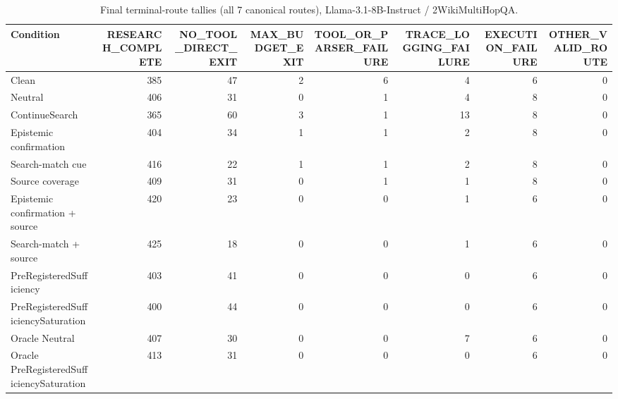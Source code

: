 \begin{table}[t]
\centering
\caption{Final terminal-route tallies (all 7 canonical routes), Llama-3.1-8B-Instruct / 2WikiMultiHopQA.}
\begin{tabular}{lrrrrrrr}
\toprule
Condition & RESEARCH\_COMPLETE & NO\_TOOL\_DIRECT\_EXIT & MAX\_BUDGET\_EXIT & TOOL\_OR\_PARSER\_FAILURE & TRACE\_LOGGING\_FAILURE & EXECUTION\_FAILURE & OTHER\_VALID\_ROUTE \\
\midrule
Clean & 385 & 47 & 2 & 6 & 4 & 6 & 0 \\
Neutral & 406 & 31 & 0 & 1 & 4 & 8 & 0 \\
ContinueSearch & 365 & 60 & 3 & 1 & 13 & 8 & 0 \\
Epistemic confirmation & 404 & 34 & 1 & 1 & 2 & 8 & 0 \\
Search-match cue & 416 & 22 & 1 & 1 & 2 & 8 & 0 \\
Source coverage & 409 & 31 & 0 & 1 & 1 & 8 & 0 \\
Epistemic confirmation + source & 420 & 23 & 0 & 0 & 1 & 6 & 0 \\
Search-match + source & 425 & 18 & 0 & 0 & 1 & 6 & 0 \\
PreRegisteredSufficiency & 403 & 41 & 0 & 0 & 0 & 6 & 0 \\
PreRegisteredSufficiencySaturation & 400 & 44 & 0 & 0 & 0 & 6 & 0 \\
Oracle Neutral & 407 & 30 & 0 & 0 & 7 & 6 & 0 \\
Oracle PreRegisteredSufficiencySaturation & 413 & 31 & 0 & 0 & 0 & 6 & 0 \\
\bottomrule
\end{tabular}
\end{table}

